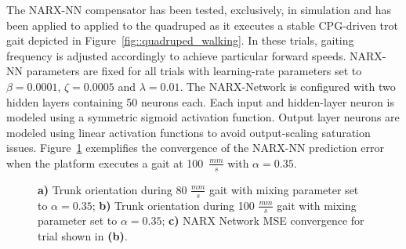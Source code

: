 			The NARX-NN compensator has been tested, exclusively, in simulation and has been applied to applied to the quadruped as it executes a stable CPG-driven trot gait depicted in Figure~\ref{fig::quadruped_walking}. In these trials, gaiting frequency is adjusted accordingly to achieve particular forward speeds. NARX-NN parameters are fixed for all trials with learning-rate  parameters set to $\beta=0.0001$, $\zeta=0.0005$ and $\lambda = 0.01$. The NARX-Network is configured with two hidden layers containing 50 neurons each. Each input and hidden-layer neuron is modeled using a symmetric sigmoid activation function. Output layer neurons are modeled using linear activation functions to  avoid output-scaling saturation issues. Figure~\ref{fig::fast} exemplifies the convergence of the NARX-NN prediction error when the platform executes a gait at  100~$\frac{mm}{s}$ with $\alpha = 0.35$.
%
			\begin{figure}[h!]
				\centering
				\caption{ 
					\textbf{a)} Trunk orientation during 80 $\frac{mm}{s}$ gait with mixing  parameter set to $\alpha = 0.35$; \textbf{b)} Trunk orientation during 100 $\frac{mm}{s}$ gait with mixing parameter set to $\alpha = 0.35$; \textbf{c)} NARX Network MSE convergence for trial shown in \textbf{(b)}.
				}
				\label{fig::fast}
			\end{figure}


